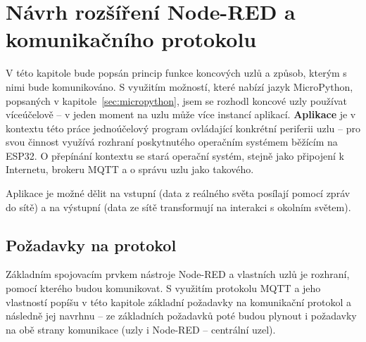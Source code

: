 \chapter{Návrh rozšíření Node-RED a komunikačního protokolu}
\label{ch:protokol}

V této kapitole bude popsán princip funkce koncových uzlů a způsob, kterým s nimi bude komunikováno.
S využitím možností, které nabízí jazyk MicroPython, popsaných v kapitole~\ref{sec:micropython}, jsem se rozhodl
koncové uzly používat víceúčelově -- v jeden moment na uzlu může více instancí aplikací.
\textbf{Aplikace} je v kontextu této práce jednoúčelový program ovládající konkrétní periferii uzlu -- pro svou činnost
využívá rozhraní poskytnutého operačním systémem běžícím na ESP32.
O přepínání kontextu se stará operační systém, stejně jako připojení k Internetu, brokeru MQTT a o správu uzlu jako
takového.

Aplikace je možné dělit na vstupní (data z reálného světa posílají pomocí zpráv do sítě) a na výstupní (data ze sítě
transformují na interakci s okolním světem).

\section{Požadavky na protokol}\label{sec:pozadavky-na-protokol}
Základním spojovacím prvkem nástroje Node-RED a vlastních uzlů je rozhraní, pomocí kterého budou
komunikovat.
S využitím protokolu MQTT a jeho vlastností popíšu v této kapitole základní požadavky na komunikační protokol a
následně jej navrhnu -- ze základních požadavků poté budou plynout i požadavky na obě strany komunikace (uzly i
Node-RED -- centrální uzel).


